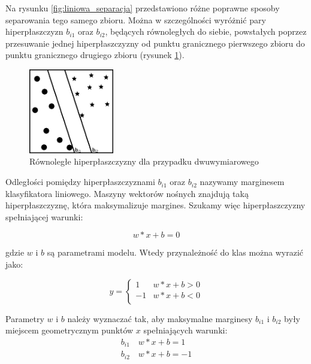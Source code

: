 Na rysunku \ref{fig:liniowa_separacja} przedstawiono różne poprawne sposoby separowania tego samego zbioru. Można w szczególności wyróżnić pary hiperpłaszczyzn $b_{i1}$ oraz $b_{i2}$, będących równoległych do 
siebie, powstałych poprzez przesuwanie jednej hiperpłaszczyzny od punktu granicznego pierwszego zbioru do punktu granicznego drugiego zbioru (rysunek \ref{fig:rownolegla_separacja}).
\begin{figure}[h!]
    \centering
    \includegraphics[width=0.33\textwidth]{img/granica_rownolegla.jpg}
    \caption{Równoległe hiperpłaszczyzny dla przypadku dwuwymiarowego}
    \label{fig:rownolegla_separacja}
\end{figure}

Odległości pomiędzy hiperpłaszczyznami $b_{i1}$ oraz $b_{i2}$ nazywamy marginesem klasyfikatora liniowego. Maszyny wektorów nośnych znajdują taką hiperpłaszczyznę, która maksymalizuje margines. Szukamy więc hiperpłaszczyzny spełniającej warunki:

\begin{equation}
    w*x + b =0
\end{equation}

gdzie $w$ i $b$ są parametrami modelu. Wtedy przynależność do klas można wyrazić jako:

\begin{displaymath}
    y = \left\{ \begin{array}{ll}
        1 & \textrm{$w*x+b>0$}\\
        -1 & \textrm{$w*x+b<0$}\\
    \end{array} \right.
\end{displaymath}

Parametry $w$ i $b$ należy wyznaczać tak, aby maksymalne marginesy $b_{i1}$ i $b_{i2}$ były miejscem geometrycznym punktów $x$ spełniających warunki:
\begin{eqnarray}
    b_{i1} \quad w*x + b =1 \\
    b_{i2} \quad w*x + b =-1
\end{eqnarray}

